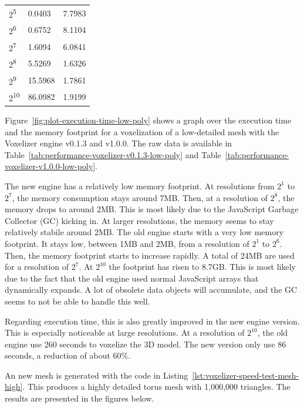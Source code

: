 \begin{table}[H]
\begin{minipage}[t]{.45\linewidth}
\begin{tabularx}{\textwidth}{*{3}{|Y}|}
            2\textsuperscript{5} & 0.0403 & 7.7983\\
            2\textsuperscript{6} & 0.6752 & 8.1104\\
            2\textsuperscript{7} & 1.6094 & 6.0841\\
            2\textsuperscript{8} & 5.5269 & 1.6326\\
            2\textsuperscript{9} & 15.5968 & 1.7861\\
            2\textsuperscript{10} & 86.0982 & 1.9199\\
            \hline
        \end{tabularx}
    \end{minipage}
\end{table}

Figure~\ref{fig:plot-execution-time-low-poly} shows a graph over the execution time and the memory footprint for a voxelization of a low-detailed mesh with the Voxelizer engine v0.1.3 and v1.0.0. The raw data is available in Table~\ref{tab:performance-voxelizer-v0.1.3-low-poly} and Table~\ref{tab:performance-voxelizer-v1.0.0-low-poly}.

The new engine has a relatively low memory footprint. At resolutions from $2^1$ to $2^7$, the memory consumption stays around 7MB. Then, at a resolution of $2^8$, the memory drops to around 2MB. This is most likely due to the JavaScript Garbage Collector (GC) kicking in. At larger resolutions, the memory seems to stay relatively stabile around 2MB. The old engine starts with a very low memory footprint. It stays low, between 1MB and 2MB, from a resolution of $2^1$ to $2^6$. Then, the memory footprint starts to increase rapidly. A total of 24MB are used for a resolution of $2^7$. At $2^{10}$ the footprint has risen to 8.7GB. This is most likely due to the fact that the old engine used normal JavaScript arrays that dynamically expands. A lot of obsolete data objects will accumulate, and the GC seems to not be able to handle this well.

Regarding execution time, this is also greatly improved in the new engine version. This is especially noticeable at large resolutions. At a resolution of $2^{10}$, the old engine use 260 seconds to voxelize the 3D model. The new version only use 86 seconds, a reduction of about $60\%$.

An new mesh is generated with the code in Listing~\ref{lst:voxelizer-speed-test-mesh-high}. This produces a highly detailed torus mesh with 1,000,000 triangles. The results are presented in the figures below.

